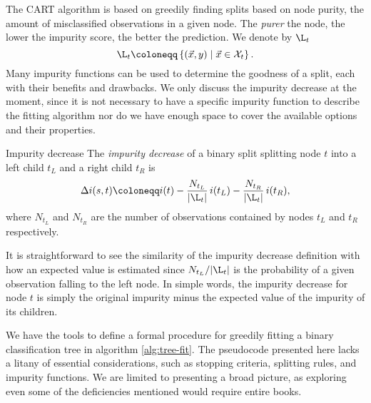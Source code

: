 The CART algorithm is based on greedily finding splits based on node purity, the
amount of misclassified observations in a given node. The \textit{purer} the
node, the lower the impurity score, the better the prediction. We denote by
$\L_t$
\[
    \L_t \coloneqq \left\{ (\vec{x}, y) \mid \vec{x} \in \mathcal{X}_t \right\}.
\]
Many impurity functions can be used to determine the goodness of a split, each
with their benefits and drawbacks. We only discuss the impurity decrease at the
moment, since it is not necessary to have a specific impurity function to
describe the fitting algorithm nor do we have enough space to cover the
available options and their properties.

\begin{dfn}{Impurity decrease}{}
    The \emph{impurity decrease} of a binary split splitting node $t$ into a
    left child $t_L$ and a right child $t_R$ is
    \[
        \Delta i(s, t) \coloneqq i(t) - \frac{N_{t_L}}{|\L_t|} \, i(t_L) - \frac{N_{t_R}}{|\L_t|} \, i(t_R),
    \]
    where $N_{t_L}$ and $N_{t_R}$ are the number of observations contained by
    nodes $t_L$ and $t_R$ respectively.
\end{dfn}

It is straightforward to see the similarity of the impurity decrease definition
with how an expected value is estimated since $N_{t_L} / |\L_t|$ is the
probability of a given observation falling to the left node. In simple words,
the impurity decrease for node $t$ is simply the original impurity minus the
expected value of the impurity of its children.

We have the tools to define a formal procedure for greedily fitting a binary
classification tree in algorithm \ref{alg:tree-fit}. The pseudocode presented
here lacks a litany of essential considerations, such as stopping criteria,
splitting rules, and impurity functions. We are limited to presenting a broad
picture, as exploring even some of the deficiencies mentioned would require
entire books.

